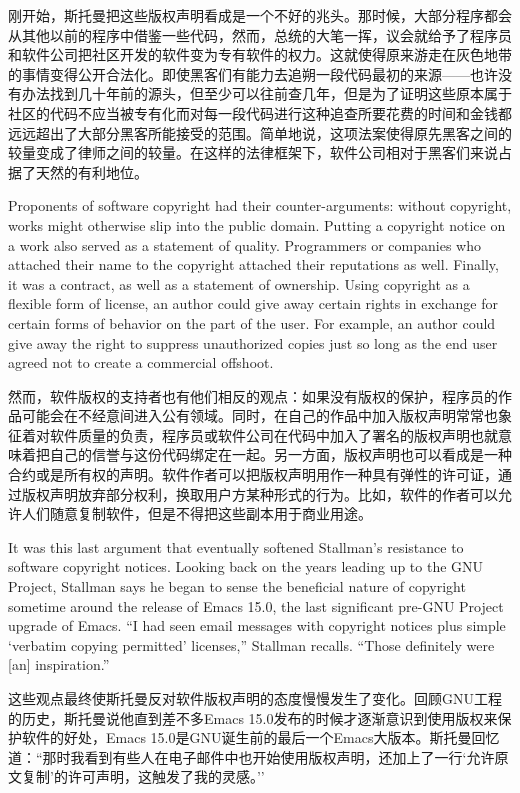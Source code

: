 \ifdefined\chs
刚开始，斯托曼把这些版权声明看成是一个不好的兆头。那时候，大部分程序都会从其他以前的程序中借鉴一些代码，然而，总统的大笔一挥，议会就给予了程序员和软件公司把社区开发的软件变为专有软件的权力。这就使得原来游走在灰色地带的事情变得公开合法化。即使黑客们有能力去追朔一段代码最初的来源——也许没有办法找到几十年前的源头，但至少可以往前查几年，但是为了证明这些原本属于社区的代码不应当被专有化而对每一段代码进行这种追查所要花费的时间和金钱都远远超出了大部分黑客所能接受的范围。简单地说，这项法案使得原先黑客之间的较量变成了律师之间的较量。在这样的法律框架下，软件公司相对于黑客们来说占据了天然的有利地位。
\fi

\ifdefined\eng
Proponents of software copyright had their counter-arguments: without copyright, works might otherwise slip into the public domain. Putting a copyright notice on a work also served as a statement of quality. Programmers or companies who attached their name to the copyright attached their reputations as well. Finally, it was a contract, as well as a statement of ownership. Using copyright as a flexible form of license, an author could give away certain rights in exchange for certain forms of behavior on the part of the user. For example, an author could give away the right to suppress unauthorized copies just so long as the end user agreed not to create a commercial offshoot.
\fi

\ifdefined\chs
然而，软件版权的支持者也有他们相反的观点：如果没有版权的保护，程序员的作品可能会在不经意间进入公有领域。同时，在自己的作品中加入版权声明常常也象征着对软件质量的负责，程序员或软件公司在代码中加入了署名的版权声明也就意味着把自己的信誉与这份代码绑定在一起。另一方面，版权声明也可以看成是一种合约或是所有权的声明。软件作者可以把版权声明用作一种具有弹性的许可证，通过版权声明放弃部分权利，换取用户方某种形式的行为。比如，软件的作者可以允许人们随意复制软件，但是不得把这些副本用于商业用途。
\fi

\ifdefined\eng
It was this last argument that eventually softened Stallman's resistance to software copyright notices. Looking back on the years leading up to the GNU Project, Stallman says he began to sense the beneficial nature of copyright sometime around the release of Emacs 15.0, the last significant pre-GNU Project upgrade of Emacs. ``I had seen email messages with copyright notices plus simple `verbatim copying permitted' licenses,'' Stallman recalls. ``Those definitely were [an] inspiration.''
\fi

\ifdefined\chs
这些观点最终使斯托曼反对软件版权声明的态度慢慢发生了变化。回顾GNU工程的历史，斯托曼说他直到差不多Emacs 15.0发布的时候才逐渐意识到使用版权来保护软件的好处，Emacs 15.0是GNU诞生前的最后一个Emacs大版本。斯托曼回忆道：``那时我看到有些人在电子邮件中也开始使用版权声明，还加上了一行`允许原文复制'的许可声明，这触发了我的灵感。''
\fi

